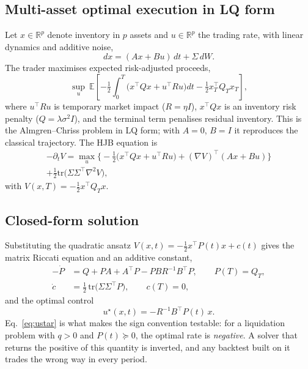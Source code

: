 \documentclass[conference]{IEEEtran}
\begin{document}
\subsection{Multi-asset optimal execution in LQ form}
Let $x \in \mathbb{R}^p$ denote inventory in $p$ assets and $u \in \mathbb{R}^p$ the trading
rate, with linear dynamics and additive noise,
\begin{equation}
dx = (Ax + Bu)\,dt + \Sigma\,dW .
\end{equation}
The trader maximises expected risk-adjusted proceeds,
\begin{equation}
\sup_{u}\ \mathbb{E}\!\left[
-\tfrac{1}{2}\!\int_0^T\!\!\big(x^\top Q x + u^\top R u\big)dt
-\tfrac{1}{2}x_T^\top Q_T x_T
\right],
\end{equation}
where $u^\top R u$ is temporary market impact ($R = \eta I$), $x^\top Q x$ is an inventory
risk penalty ($Q = \lambda\sigma^2 I$), and the terminal term penalises residual inventory.
This is the Almgren--Chriss problem in LQ form; with $A = 0$, $B = I$ it reproduces the
classical trajectory. The HJB equation is
\begin{equation}
\begin{split}
-\partial_t V = \max_u\Big\{-\tfrac{1}{2}\big(x^\top Qx + u^\top Ru\big)
+ (\nabla V)^\top(Ax + Bu)\Big\} \\
+ \tfrac{1}{2}\mathrm{tr}\big(\Sigma\Sigma^\top \nabla^2 V\big),
\end{split}
\end{equation}
with $V(x,T) = -\tfrac{1}{2}x^\top Q_T x$.

\subsection{Closed-form solution}
Substituting the quadratic ansatz $V(x,t) = -\tfrac{1}{2}x^\top P(t)x + c(t)$ gives the
matrix Riccati equation and an additive constant,
\begin{align}
-\dot P &= Q + PA + A^\top P - PBR^{-1}B^\top P, \qquad P(T) = Q_T, \\
\dot c &= \tfrac{1}{2}\,\mathrm{tr}\big(\Sigma\Sigma^\top P\big), \qquad c(T) = 0,
\end{align}
and the optimal control
\begin{equation}\label{eq:ustar}
u^\star(x,t) = -R^{-1}B^\top P(t)\,x .
\end{equation}
Eq.~\eqref{eq:ustar} is what makes the sign convention testable: for a liquidation problem
with $q > 0$ and $P(t) \succeq 0$, the optimal rate is \emph{negative}. A solver that returns
the positive of this quantity is inverted, and any backtest built on it trades the wrong way
in every period.
\end{document}
